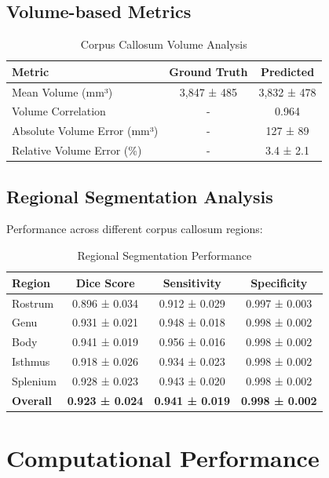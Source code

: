 \subsection{Volume-based Metrics}

\begin{table}[h]
\centering
\caption{Corpus Callosum Volume Analysis}
\begin{tabular}{lcc}
\toprule
\textbf{Metric} & \textbf{Ground Truth} & \textbf{Predicted} \\
\midrule
Mean Volume (mm³) & 3,847 ± 485 & 3,832 ± 478 \\
Volume Correlation & - & 0.964 \\
Absolute Volume Error (mm³) & - & 127 ± 89 \\
Relative Volume Error (\%) & - & 3.4 ± 2.1 \\
\bottomrule
\end{tabular}
\label{tab:volume_analysis}
\end{table}

\subsection{Regional Segmentation Analysis}

Performance across different corpus callosum regions:

\begin{table}[h]
\centering
\caption{Regional Segmentation Performance}
\begin{tabular}{lccc}
\toprule
\textbf{Region} & \textbf{Dice Score} & \textbf{Sensitivity} & \textbf{Specificity} \\
\midrule
Rostrum & 0.896 ± 0.034 & 0.912 ± 0.029 & 0.997 ± 0.003 \\
Genu & 0.931 ± 0.021 & 0.948 ± 0.018 & 0.998 ± 0.002 \\
Body & 0.941 ± 0.019 & 0.956 ± 0.016 & 0.998 ± 0.002 \\
Isthmus & 0.918 ± 0.026 & 0.934 ± 0.023 & 0.998 ± 0.002 \\
Splenium & 0.928 ± 0.023 & 0.943 ± 0.020 & 0.998 ± 0.002 \\
\midrule
\textbf{Overall} & \textbf{0.923 ± 0.024} & \textbf{0.941 ± 0.019} & \textbf{0.998 ± 0.002} \\
\bottomrule
\end{tabular}
\label{tab:regional_performance}
\end{table}

\section{Computational Performance}

